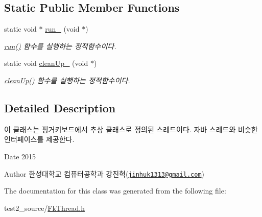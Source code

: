 \subsection*{Static Public Member Functions}
\begin{DoxyCompactItemize}
\item 
\hypertarget{class_fk_thread_aa00578efb1c6a1fc84a816d8f8d899d2}{}static void $\ast$ \hyperlink{class_fk_thread_aa00578efb1c6a1fc84a816d8f8d899d2}{run\+\_\+} (void $\ast$)\label{class_fk_thread_aa00578efb1c6a1fc84a816d8f8d899d2}

\begin{DoxyCompactList}\small\item\em \hyperlink{class_fk_thread_aed0239353fc403d6cfeaab64c1bc17c3}{run()} 함수를 실행하는 정적함수이다. \end{DoxyCompactList}\item 
\hypertarget{class_fk_thread_a9f8251e89e4add076db9b50d73a374ef}{}static void \hyperlink{class_fk_thread_a9f8251e89e4add076db9b50d73a374ef}{clean\+Up\+\_\+} (void $\ast$)\label{class_fk_thread_a9f8251e89e4add076db9b50d73a374ef}

\begin{DoxyCompactList}\small\item\em \hyperlink{class_fk_thread_a38e4c34b4e83e41c379e108fb865d3c2}{clean\+Up()} 함수를 실행하는 정적함수이다. \end{DoxyCompactList}\end{DoxyCompactItemize}


\subsection{Detailed Description}
이 클래스는 핑거키보드에서 추상 클래스로 정의된 스레드이다. 자바 스레드와 비슷한 인터페이스를 제공한다. 

\begin{DoxyDate}{Date}
2015 
\end{DoxyDate}
\begin{DoxyAuthor}{Author}
한성대학교 컴퓨터공학과 강진혁(\href{mailto:jinhuk1313@gmail.com}{\tt jinhuk1313@gmail.\+com}) 
\end{DoxyAuthor}


The documentation for this class was generated from the following file\+:\begin{DoxyCompactItemize}
\item 
test2\+\_\+source/\hyperlink{_fk_thread_8h}{Fk\+Thread.\+h}\end{DoxyCompactItemize}
